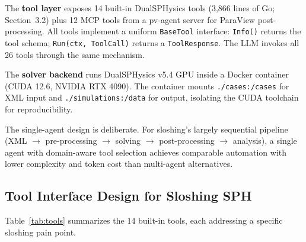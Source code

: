 \documentclass[11pt]{article}
\begin{document}
The \textbf{tool layer} exposes 14 built-in DualSPHysics tools (3,866 lines of Go; Section~3.2) plus 12 MCP tools from a pv-agent server for ParaView post-processing. All tools implement a uniform \texttt{BaseTool} interface: \texttt{Info()} returns the tool schema; \texttt{Run(ctx, ToolCall)} returns a \texttt{ToolResponse}. The LLM invokes all 26 tools through the same mechanism.

The \textbf{solver backend} runs DualSPHysics v5.4 GPU inside a Docker container (CUDA 12.6, NVIDIA RTX 4090). The container mounts \texttt{./cases:/cases} for XML input and \texttt{./simulations:/data} for output, isolating the CUDA toolchain for reproducibility.

The single-agent design is deliberate. For sloshing's largely sequential pipeline (XML $\rightarrow$ pre-processing $\rightarrow$ solving $\rightarrow$ post-processing $\rightarrow$ analysis), a single agent with domain-aware tool selection achieves comparable automation with lower complexity and token cost than multi-agent alternatives.

\subsection{Tool Interface Design for Sloshing SPH}

Table~\ref{tab:tools} summarizes the 14 built-in tools, each addressing a specific sloshing pain point.
\end{document}
